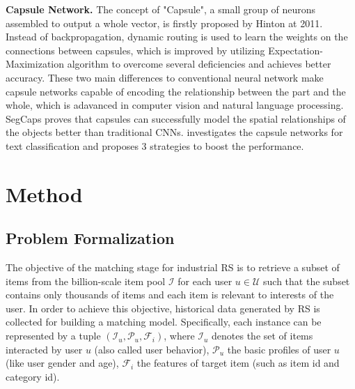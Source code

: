 \documentclass[sigconf]{acmart}
\begin{document}
\textbf{Capsule Network.}
The concept of "Capsule", a small group of neurons assembled to output a whole vector, is firstly proposed by Hinton \cite{hinton2011transforming} at 2011.
Instead of backpropagation, dynamic routing \cite{sabour2017dynamic} is used to learn the weights on the connections between capsules, which is improved by utilizing Expectation-Maximization algorithm \cite{hinton2018matrix} to overcome several deficiencies and achieves better accuracy.
These two main differences to conventional neural network make capsule networks capable of encoding the relationship between the part and the whole, which is adavanced in computer vision and natural language processing.
SegCaps \cite{lalonde2018capsules} proves that capsules can successfully model the spatial relationships of the objects better than traditional CNNs.
\cite{zhao2018investigating} investigates the capsule networks for text classification and proposes 3 strategies to boost the performance.

\section{Method}

\subsection{Problem Formalization}
The objective of the matching stage for industrial RS is to retrieve a subset of items from the billion-scale item pool $\mathcal{I}$ for each user $u \in \mathcal{U}$ such that the subset contains only thousands of items and each item is relevant to interests of the user.
In order to achieve this objective, historical data generated by RS is collected for building a matching model.
Specifically, each instance can be represented by a tuple $(\mathcal{I}_u, \mathcal{P}_u, \mathcal{F}_i)$, where $\mathcal{I}_u$ denotes the set of items interacted by user $u$ (also called user behavior), $\mathcal{P}_u$ the basic profiles of user $u$ (like user gender and age), $\mathcal{F}_i$ the features of target item (such as item id and category id).
\end{document}
